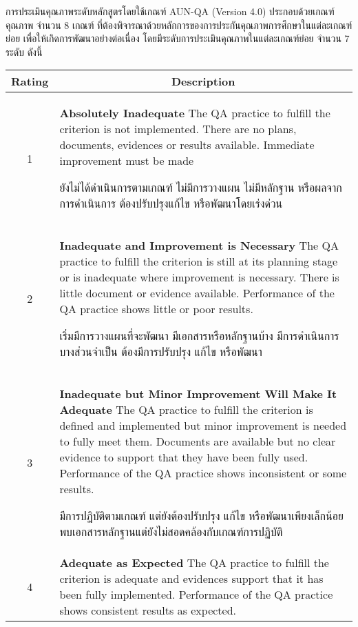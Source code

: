 การประเมินคุณภาพระดับหลักสูตรโดยใช้เกณฑ์ AUN-QA (Version 4.0) ประกอบด้วยเกณฑ์คุณภาพ จำนวน 8 เกณฑ์ ที่ต้องพิจารณาด้วยหลักการของการประกันคุณภาพการศึกษาในแต่ละเกณฑ์ย่อย เพื่อให้เกิดการพัฒนาอย่างต่อเนื่อง โดยมีระดับการประเมินคุณภาพในแต่ละเกณฑ์ย่อย จำนวน 7 ระดับ ดังนี้
\begin{longtable}{|c|p{}|}
\hline
\textbf{Rating}&\multicolumn{1}{c|}{\textbf{Description}}\\\hline
\endhead
1&\textbf{Absolutely Inadequate}\newline
The QA practice to fulfill the criterion is not implemented. There are no plans, documents, evidences or results available. Immediate improvement must be made\newline

ยังไม่ได้ดำเนินการตามเกณฑ์ ไม่มีการวางแผน ไม่มีหลักฐาน หรือผลจากการดำเนินการ 
ต้องปรับปรุงแก้ไข หรือพัฒนาโดยเร่งด่วน \\\hline

2&\textbf{Inadequate and Improvement is Necessary}\newline 
The QA practice to fulfill the criterion is still at its planning stage or is inadequate where improvement is necessary. There is little document or evidence available. Performance of the QA practice shows little or poor results.\newline

เริ่มมีการวางแผนที่จะพัฒนา มีเอกสารหรือหลักฐานบ้าง มีการดำเนินการบางส่วนจำเป็น
ต้องมีการปรับปรุง แก้ไข หรือพัฒนา\\\hline

3&\textbf{Inadequate but Minor Improvement Will Make It Adequate}\newline 
The QA practice to fulfill the criterion is defined and implemented but minor improvement is needed to fully meet them. Documents are available but no clear evidence to support that they have been fully used. Performance of the QA practice shows inconsistent or some results.\newline
 
มีการปฏิบัติตามเกณฑ์ แต่ยังต้องปรับปรุง แก้ไข หรือพัฒนาเพียงเล็กน้อย พบเอกสารหลักฐานแต่ยังไม่สอดคล้องกับเกณฑ์การปฏิบัติ\\\hline

4&\textbf{Adequate as Expected} \newline 
The QA practice to fulfill the criterion is adequate and evidences support that it has been fully implemented. Performance of the QA practice shows consistent results as expected.\newline


\end{longtable}

